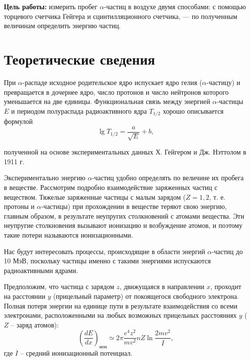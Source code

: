 
\newcommand{\tocsection}[1]{\section*{#1} \addcontentsline{toc}{section}{#1}}
\newcommand{\tocsubsection}[1]{\subsection*{#1} \addcontentsline{toc}{subsection}{#1}}



	
	\newpage
	
	\tableofcontents
	
	
	
	\newpage
	\textbf{Цель работы:} измерить пробег $\alpha$-частиц в воздухе двумя способами: с помощью торцевого счетчика Гейгера и сцинтилляционного счетчика, — по полученным величинам определить энергию частиц.
	
	\tocsection{Теоретические сведения}

	
	При $\alpha$-распаде исходное родительское ядро испускает ядро гелия ($\alpha$-частицу) и превращается в дочернее ядро, число протонов и число нейтронов которого уменьшается на две единицы.  Функциональная связь между энергией $\alpha$-частицы $E$ и периодом полураспада радиоактивного ядра $T_{1/2}$ хорошо описывается формулой
	\begin{equation}
		\lg T_{1/2} = \frac{a}{\sqrt{E}} + b,
	\end{equation}

	\noindent полученной на основе экспериментальных данных Х. Гейгером и Дж. Нэттолом в 1911 г.
		
	Экспериментально энергию $\alpha$-частиц удобно определять по величине их пробега в веществе. Рассмотрим подробно взаимодействие заряженных частиц с веществом. Тяжелые заряженные частицы с малым зарядом ($Z = 1, 2$, т. е. протоны и $\alpha$-частицы) при прохождении в веществе теряют свою энергию, главным образом, в результате неупругих столкновений с атомами вещества. Эти неупругие столкновения вызывают ионизацию и возбуждение атомов, и поэтому такие потери называются ионизационными.
	
	Нас будут интересовать процессы, происходящие в области энергий $\alpha$-частиц до 10 МэВ, поскольку частицы именно с такими энергиями испускаются радиоактивными ядрами.
	
	Предположим, что частица с зарядом $z$, движущаяся в направлении $x$, проходит на расстоянии $y$ (прицельный параметр) от покоящегося свободного электрона. Полная потеря энергии на единице пути в результате взаимодействия со всеми электронами, расположенными на любых возможных прицельных расстояниях $y$ ($Z$ -- заряд атомов):
	\begin{equation}
		\left(\frac{dE}{dx}\right)_\text{ион} \simeq 2\pi\frac{e^4 z^2}{mv^2}nZ\ln\frac{2mv^2}{\overline{I}},
		\label{AlphaParticles_FreeRun}
	\end{equation}
	\noindent где $\overline{I}$ -- средний ионизационный потенциал.

